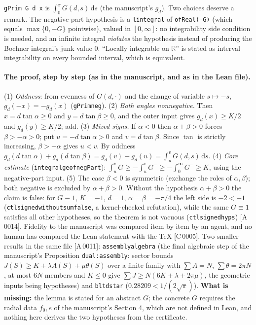 \documentclass[10pt]{article}
\newcommand{\R}{\mathbb{R}}
\newcommand{\tg}[2]{\texorpdfstring{\textsf{[#1\,#2]}}{}}  %
\newcommand{\lean}[1]{\texttt{#1}}
\newcommand{\dd}{\,\mathrm{d}}
\renewcommand{\_}{\textunderscore\allowbreak}
\begin{document}
\lean{gPrim G d x} is $\int_0^x G(d,s)\dd s$ (the manuscript's $g_d$). Two choices deserve a remark. The negative-part hypothesis is a \lean{lintegral} of \lean{ofReal(-G)} (which equals $\max\{0,-G\}$ pointwise), valued in $[0,\infty]$: no integrability side condition is needed, and an infinite integral \emph{violates} the hypothesis instead of producing the Bochner integral's junk value $0$. ``Locally integrable on $\R$'' is stated as interval integrability on every bounded interval, which is equivalent.

\paragraph{The proof, step by step (as in the manuscript, and as in the Lean file).}
(1) \emph{Oddness}: from evenness of $G(d,\cdot)$ and the change of variable $s\mapsto-s$, $g_d(-x)=-g_d(x)$ (\lean{gPrim\_neg}).
(2) \emph{Both angles nonnegative.} Then $x=d\tan\alpha\ge0$ and $y=d\tan\beta\ge0$, and the outer input gives $g_d(x)\ge K/2$ and $g_d(y)\ge K/2$; add.
(3) \emph{Mixed signs.} If $\alpha<0$ then $\alpha+\beta>0$ forces $\beta>-\alpha>0$; put $u=-d\tan\alpha>0$ and $v=d\tan\beta$. Since $\tan$ is strictly increasing, $\beta>-\alpha$ gives $u<v$. By oddness
$g_d(d\tan\alpha)+g_d(d\tan\beta)=g_d(v)-g_d(u)=\int_u^vG(d,s)\dd s$.
(4) \emph{Core estimate} (\lean{integral\_ge\_of\_negPart}): $\int_u^vG\ge-\int_u^vG^-\ge-\int_0^\infty G^-\ge K$, using the negative-part input.
(5) The case $\beta<0$ is symmetric (exchange the roles of $\alpha,\beta$); both negative is excluded by $\alpha+\beta>0$.
Without the hypothesis $\alpha+\beta>0$ the claim is false: for $G\equiv1$, $K=-1$, $d=1$, $\alpha=\beta=-\pi/4$ the left side is $-2<-1$ (\lean{ctl\_signed\_without\_sum\_false}, a kernel-checked refutation), while the same $G\equiv1$ satisfies all other hypotheses, so the theorem is not vacuous (\lean{ctl\_signed\_hyps}) \tg{A}{0014}.
Fidelity to the manuscript was compared item by item by an agent, and no human has compared the Lean statement with the TeX \tg{C}{0005}. Two smaller results in the same file \tg{A}{0011}: \lean{assembly\_algebra} (the final algebraic step of the manuscript's Proposition \texttt{dual:assembly}: sector bounds $J(S)\ge K+\lambda A(S)+\mu\theta(S)$ over a finite family with $\sum A=N$, $\sum\theta=2\pi N$, at most $6N$ members and $K\le0$ give $\sum J\ge N(6K+\lambda+2\pi\mu)$, the geometric inputs being hypotheses) and \lean{b\_lt\_dstar} ($0.28209<1/(2\sqrt\pi)$). \textbf{What is missing:} the lemma is stated for an abstract $G$; the concrete $G$ requires the radial data $f_0,e$ of the manuscript's Section 4, which are not defined in Lean, and nothing here derives the two hypotheses from the certificate.
\end{document}
